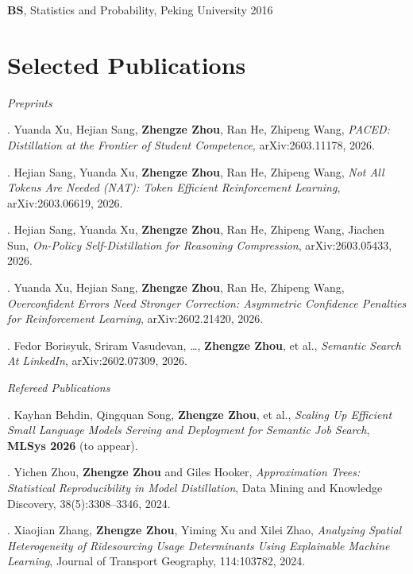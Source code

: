 \documentclass{article}
\begin{document}
\vspace{1mm}

\noindent\textbf{BS}, Statistics and Probability, Peking University \hfill 2016

\section*{Selected Publications}

\noindent\textit{Preprints}

\vspace{1mm}

. Yuanda Xu, Hejian Sang, \textbf{Zhengze Zhou}, Ran He, Zhipeng Wang,
\textit{PACED: Distillation at the Frontier of Student Competence}, arXiv:2603.11178, 2026.

. Hejian Sang, Yuanda Xu, \textbf{Zhengze Zhou}, Ran He, Zhipeng Wang,
\textit{Not All Tokens Are Needed (NAT): Token Efficient Reinforcement Learning}, arXiv:2603.06619, 2026.

. Hejian Sang, Yuanda Xu, \textbf{Zhengze Zhou}, Ran He, Zhipeng Wang, Jiachen Sun,
\textit{On-Policy Self-Distillation for Reasoning Compression}, arXiv:2603.05433, 2026.

. Yuanda Xu, Hejian Sang, \textbf{Zhengze Zhou}, Ran He, Zhipeng Wang,
\textit{Overconfident Errors Need Stronger Correction: Asymmetric Confidence Penalties
for Reinforcement Learning}, arXiv:2602.21420, 2026.

. Fedor Borisyuk, Sriram Vasudevan, \ldots, \textbf{Zhengze Zhou}, et al.,
\textit{Semantic Search At LinkedIn}, arXiv:2602.07309, 2026.

\vspace{2mm}

\noindent\textit{Refereed Publications}

\vspace{1mm}

. Kayhan Behdin, Qingquan Song, \textbf{Zhengze Zhou}, et al.,
\textit{Scaling Up Efficient Small Language Models Serving and Deployment for Semantic Job Search},
\textbf{MLSys 2026} (to appear).

. Yichen Zhou, \textbf{Zhengze Zhou} and Giles Hooker,
\textit{Approximation Trees: Statistical Reproducibility in Model Distillation},
Data Mining and Knowledge Discovery, 38(5):3308--3346, 2024.

. Xiaojian Zhang, \textbf{Zhengze Zhou}, Yiming Xu and Xilei Zhao,
\textit{Analyzing Spatial Heterogeneity of Ridesourcing Usage Determinants
Using Explainable Machine Learning},
Journal of Transport Geography, 114:103782, 2024.
\end{document}
